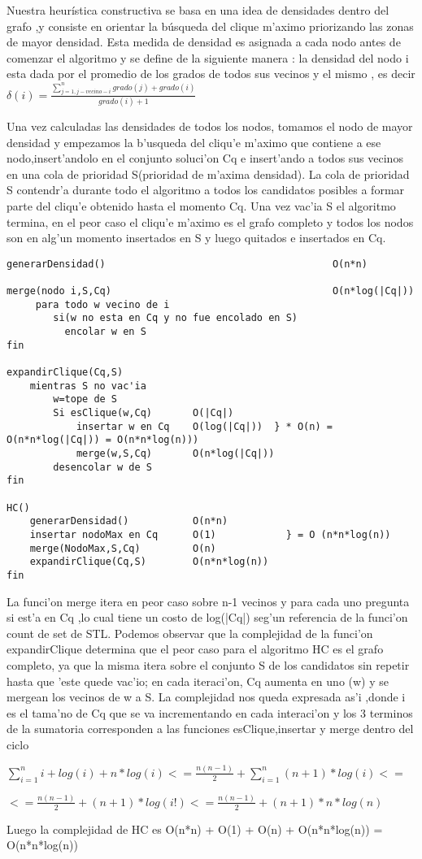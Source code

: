Nuestra heurística constructiva se basa en una idea de densidades dentro del grafo ,y consiste en orientar la búsqueda del clique m'aximo priorizando las zonas de mayor densidad.
Esta medida de densidad es asignada a cada nodo antes de comenzar el algoritmo y se define de la siguiente manera :
la densidad del nodo i esta dada por el promedio de los grados de todos sus vecinos y el mismo , es decir   $\displaystyle \delta(i) = \frac{\sum_{j=1,j-vecino-i}^{n} grado(j) + grado(i)}{grado(i)+1} $

Una vez calculadas las densidades de todos los nodos, tomamos el nodo de mayor densidad y empezamos la b'usqueda del cliqu'e m'aximo que contiene a ese nodo,insert'andolo en el conjunto soluci'on Cq e insert'ando a todos sus vecinos en una cola de prioridad S(prioridad de m'axima densidad).
La cola de prioridad S contendr'a durante todo el algoritmo a todos los candidatos posibles a formar parte del cliqu'e obtenido hasta el momento Cq.
Una vez vac'ia S el algoritmo termina, en el peor caso el cliqu'e m'aximo es el grafo completo y todos los nodos son en alg'un momento insertados en S y luego quitados e insertados en Cq.

\begin{verbatim}
generarDensidad()										O(n*n)
	
merge(nodo i,S,Cq)										O(n*log(|Cq|))	        
     para todo w vecino de i 
        si(w no esta en Cq y no fue encolado en S)
          encolar w en S
fin

expandirClique(Cq,S)								
    mientras S no vac'ia					 			
        w=tope de S									
        Si esClique(w,Cq)       O(|Cq|)				
            insertar w en Cq    O(log(|Cq|))  } * O(n) = O(n*n*log(|Cq|)) = O(n*n*log(n)))
            merge(w,S,Cq)       O(n*log(|Cq|))		
        desencolar w de S		              
fin												
									
HC()										 	
    generarDensidad()           O(n*n)		   	
    insertar nodoMax en Cq      O(1)            } = O (n*n*log(n)) 	
    merge(NodoMax,S,Cq)         O(n)			   
    expandirClique(Cq,S)        O(n*n*log(n))	 	
fin												

\end{verbatim}
La funci'on merge itera en peor caso sobre n-1 vecinos y para cada uno pregunta si est'a en Cq ,lo cual tiene un costo de log(|Cq|) seg'un referencia de la funci'on count de set de STL. 
Podemos observar que la complejidad de la funci'on expandirClique determina que el peor caso para el algoritmo HC es el grafo completo, ya que la misma itera sobre el conjunto S de los candidatos sin repetir hasta que 'este quede vac'io; en cada iteraci'on, Cq aumenta en uno (w) y se mergean los vecinos de w a S.
La complejidad nos queda expresada as'i ,donde i es el tama'no de Cq que se va incrementando en cada interaci'on y los 3 terminos de la sumatoria corresponden a las funciones esClique,insertar y merge dentro del ciclo

$\displaystyle \sum_{i=1}^{n} i + log(i) + n*log(i) <= \frac{n(n-1)}{2}+\sum_{i=1}^{n} (n+1)*log(i) <=$  
 
$\displaystyle  <= \frac{n(n-1)}{2}+(n+1)*log(i!) <= \frac{n(n-1)}{2}+(n+1)*n*log(n) $

Luego la complejidad de HC es O(n*n) + O(1) + O(n) + O(n*n*log(n)) = O(n*n*log(n))  
